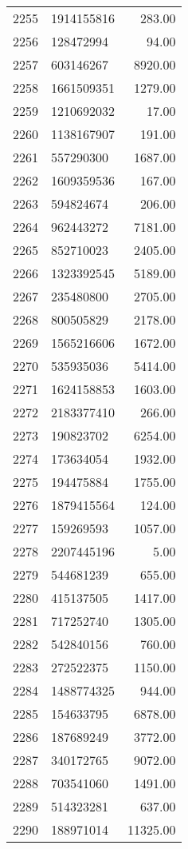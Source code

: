 \begin{table}[ht]
\begin{tabular}{rlr}
  2255 & 1914155816 & 283.00 \\ 
  2256 & 128472994 & 94.00 \\ 
  2257 & 603146267 & 8920.00 \\ 
  2258 & 1661509351 & 1279.00 \\ 
  2259 & 1210692032 & 17.00 \\ 
  2260 & 1138167907 & 191.00 \\ 
  2261 & 557290300 & 1687.00 \\ 
  2262 & 1609359536 & 167.00 \\ 
  2263 & 594824674 & 206.00 \\ 
  2264 & 962443272 & 7181.00 \\ 
  2265 & 852710023 & 2405.00 \\ 
  2266 & 1323392545 & 5189.00 \\ 
  2267 & 235480800 & 2705.00 \\ 
  2268 & 800505829 & 2178.00 \\ 
  2269 & 1565216606 & 1672.00 \\ 
  2270 & 535935036 & 5414.00 \\ 
  2271 & 1624158853 & 1603.00 \\ 
  2272 & 2183377410 & 266.00 \\ 
  2273 & 190823702 & 6254.00 \\ 
  2274 & 173634054 & 1932.00 \\ 
  2275 & 194475884 & 1755.00 \\ 
  2276 & 1879415564 & 124.00 \\ 
  2277 & 159269593 & 1057.00 \\ 
  2278 & 2207445196 & 5.00 \\ 
  2279 & 544681239 & 655.00 \\ 
  2280 & 415137505 & 1417.00 \\ 
  2281 & 717252740 & 1305.00 \\ 
  2282 & 542840156 & 760.00 \\ 
  2283 & 272522375 & 1150.00 \\ 
  2284 & 1488774325 & 944.00 \\ 
  2285 & 154633795 & 6878.00 \\ 
  2286 & 187689249 & 3772.00 \\ 
  2287 & 340172765 & 9072.00 \\ 
  2288 & 703541060 & 1491.00 \\ 
  2289 & 514323281 & 637.00 \\ 
  2290 & 188971014 & 11325.00 \\ 

\end{tabular}
\end{table}
